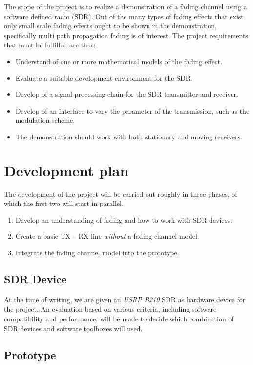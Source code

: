 \documentclass[a4paper, twosided, 11pt]{scrartcl}
\begin{document}
The scope of the project is to realize a demonstration of a fading channel using a software defined radio (SDR).
Out of the many types of fading effects that exist only small scale fading effects ought to be shown in the demonstration, specifically multi path propagation fading is of interest.
The project requirements that must be fulfilled are thus:
\begin{itemize}
	\item Understand of one or more mathematical models of the fading effect.
	\item Evaluate a suitable development environment for the SDR.
	\item Develop of a signal processing chain for the SDR transmitter and receiver.
	\item Develop of an interface to vary the parameter of the transmission, such as the modulation scheme.
	\item The demonstration should work with both stationary and moving receivers.
\end{itemize}

\section{Development plan}

The development of the project will be carried out roughly in three phases, of which the first two will start in parallel.
\begin{enumerate}
	\item Develop an understanding of fading and how to work with SDR devices.
	\item Create a basic TX -- RX line \emph{without} a fading channel model.
	\item Integrate the fading channel model into the prototype.
\end{enumerate}

\subsection{SDR Device}

At the time of writing, we are given an \emph{USRP B210} SDR as hardware device for the project.
An evaluation based on various criteria, including software compatibility and performance, will be made to decide which combination of SDR devices and software toolboxes will used.

\subsection{Prototype}
\end{document}
